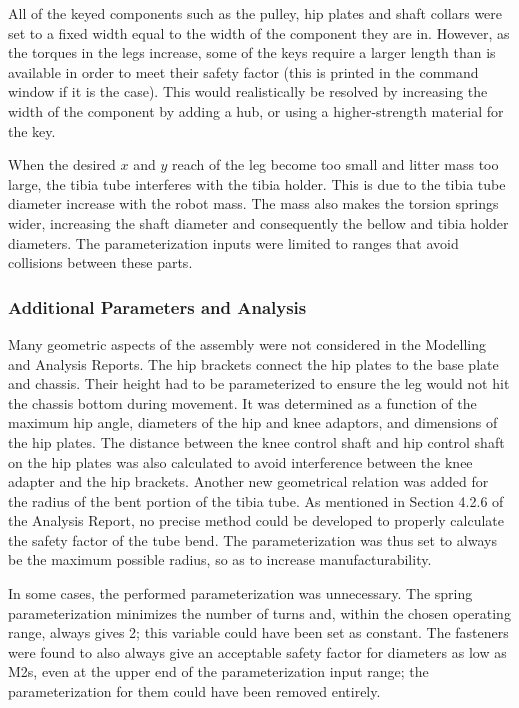 All of the keyed components such as the pulley, hip plates and shaft collars were set to a fixed width equal to the width of the component they are in. However, as the torques in the legs increase, some of the keys require a larger length than is available in order to meet their safety factor (this is printed in the command window if it is the case). 
This would realistically be resolved by increasing the width of the component by adding a hub, or using a higher-strength material for the key.

When the desired $x$ and $y$ reach of the leg become too small and litter mass too large, the tibia tube interferes with the tibia holder. This is due to the tibia tube diameter increase with the robot mass. The mass also makes the torsion springs wider, increasing the shaft diameter and consequently the bellow and tibia holder diameters. The parameterization inputs were limited to ranges that avoid collisions between these parts.



\subsubsection{Additional Parameters and Analysis}

Many geometric aspects of the assembly were not considered in the Modelling and Analysis Reports.
The hip brackets connect the hip plates to the base plate and chassis. Their height had to be parameterized to ensure the leg would not hit the chassis bottom during movement. It was determined as a function of the maximum hip angle, diameters of the hip and knee adaptors, and dimensions of the hip plates.
The distance between the knee control shaft and hip control shaft on the hip plates was also calculated to avoid interference between the knee adapter and the hip brackets.
Another new geometrical relation was added for the radius of the bent portion of the tibia tube. As mentioned in Section 4.2.6 of the Analysis Report, no precise method could be developed to properly calculate the safety factor of the tube bend.  The parameterization was thus set to always be the maximum possible radius, so as to increase manufacturability.

In some cases, the performed parameterization was unnecessary.
The spring parameterization minimizes the number of turns and, within the chosen operating range, always gives 2; this variable could have been set as constant.
The fasteners were found to also always give an acceptable safety factor for diameters as low as M2s, even at the upper end of the parameterization input range; the parameterization for them could have been removed entirely.